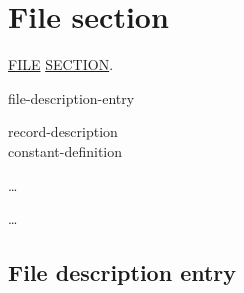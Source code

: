 \documentclass[a4paper,oneside,svgnames]{scrbook}
\makeatletter
\newcommand{\key}[1]{\underline{#1}}
\newenvironment{0-1}{$\left[ \begin{tabular}{@{}l@{}}}{\end{tabular} \right]$}
\newenvironment{1=}{$\left\{ \begin{tabular}{@{}l@{}}}{\end{tabular} \right\}$}
\makeatother
\begin{document}
\section{File section}

\begin{0-1}
  \key{FILE} \key{SECTION}.
\end{0-1}\newline
\begin{1=}
  file-description-entry
  \begin{1=}
    record-description \\
    constant-definition
  \end{1=}\ldots
\end{1=}\ldots

\subsection{File description entry}
\end{document}
